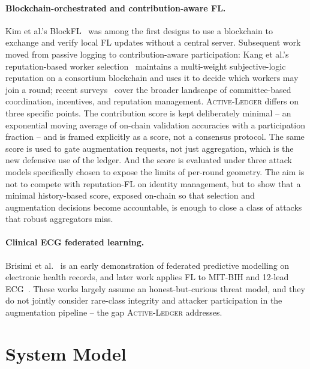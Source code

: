 \documentclass[runningheads]{llncs}
\newcommand{\actledger}{\textsc{Active-Ledger}\xspace}
\begin{document}
\paragraph{Blockchain-orchestrated and contribution-aware FL.}
Kim et al.'s BlockFL~\cite{kim2020blockfl} was among the first
designs to use a blockchain to exchange and verify local FL updates
without a central server. Subsequent work moved from passive logging
to contribution-aware participation: Kang et al.'s reputation-based
worker selection~\cite{kang2019incentive,kang2020reliable} maintains
a multi-weight subjective-logic reputation on a consortium blockchain
and uses it to decide which workers may join a round; recent
surveys~\cite{li2021bcflsurvey} cover the broader landscape of
committee-based coordination, incentives, and reputation management.
\actledger differs on three specific points. The contribution score
is kept deliberately minimal -- an exponential moving average of
on-chain validation accuracies with a participation fraction -- and
is framed explicitly as a score, not a consensus protocol. The same
score is used to gate augmentation requests, not just aggregation,
which is the new defensive use of the ledger. And the score is
evaluated under three attack models specifically chosen to expose the
limits of per-round geometry. The aim is not to compete with
reputation-FL on identity management, but to show that a minimal
history-based score, exposed on-chain so that selection and
augmentation decisions become accountable, is enough to close a class
of attacks that robust aggregators miss.

\paragraph{Clinical ECG federated learning.}
Brisimi et al.~\cite{brisimi2018ehr} is an early demonstration of
federated predictive modelling on electronic health records, and
later work applies FL to MIT-BIH and 12-lead
ECG~\cite{jimenez2024ecg}. These works largely assume an
honest-but-curious threat model, and they do not jointly consider
rare-class integrity and attacker participation in the augmentation
pipeline -- the gap \actledger addresses.

\section{System Model}
\label{sec:system}
\end{document}
